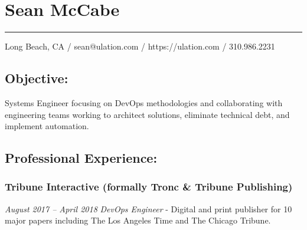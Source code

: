 \documentclass[]{article}
\date{}
\begin{document}
\hypertarget{sean-mccabe}{%
\section{Sean McCabe}\label{sean-mccabe}}

\begin{center}\rule{0.5\linewidth}{\linethickness}\end{center}

Long Beach, CA / sean@ulation.com / https://ulation.com / 310.986.2231

\hypertarget{objective}{%
\subsection{Objective:}\label{objective}}

Systems Engineer focusing on DevOps methodologies and collaborating with
engineering teams working to architect solutions, eliminate technical
debt, and implement automation.

\hypertarget{professional-experience}{%
\subsection{Professional Experience:}\label{professional-experience}}

\hypertarget{tribune-interactive-formally-tronc-tribune-publishing}{%
\subsubsection{Tribune Interactive (formally Tronc \& Tribune
Publishing)}\label{tribune-interactive-formally-tronc-tribune-publishing}}

\emph{August 2017 -- April 2018} \emph{DevOps Engineer} - Digital and
print publisher for 10 major papers including The Los Angeles Time and
The Chicago Tribune.
\end{document}
